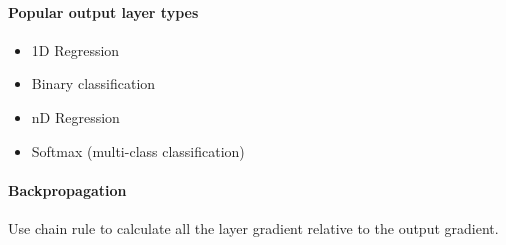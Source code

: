 		\paragraph*{Popular output layer types}
			\begin{itemize}
				\item 1D Regression
				\item Binary classification
				\item nD Regression
				\item Softmax (multi-class classification)
			\end{itemize}

		\paragraph*{Backpropagation}
			Use chain rule to calculate all the layer gradient relative to the output gradient.




